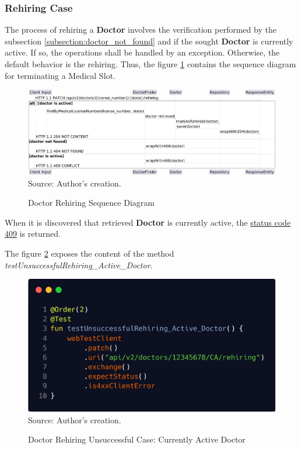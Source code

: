 \subsubsection{Rehiring  Case}
\label{subsection:doctor_rehiring}

The process of rehiring a \textbf{Doctor} involves the verification performed by the subsection \ref{subsection:doctor_not_found} and if the sought \textbf{Doctor} is currently active. If so, the operations shall be handled by an exception. Otherwise, the default behavior is the rehiring. Thus, the figure \ref{fig:doctor_rehiring_sequence_diagram} contains the sequence diagram for terminating a Medical Slot.

\begin{figure}[H]
	\centering
	\caption{Doctor Rehiring Sequence Diagram}
	\includegraphics[width=1\linewidth]{figures/doctor_rehiring_sequence_diagram.png}
	\\ \footnotesize Source: Author's creation.
	\label{fig:doctor_rehiring_sequence_diagram}
\end{figure}

When it is discovered that retrieved \textbf{Doctor} is currently active, the \hyperref[tab:summary_http_status_codes]{status code 409} is returned.

The figure \ref{fig:doctor_rehiring_unsuccessful_integration_test_active_doctor} exposes the content of the method \textit{testUnsuccessfulRehiring\_Active\_Doctor}.

\begin{figure}[H]
	\centering
	\caption{Doctor Rehiring Unsuccessful Case: Currently Active Doctor}
	\includegraphics[width=1\linewidth]
	{figures/doctor_rehiring_unsuccessful_integration_test_active_doctor.png}
	\label{fig:doctor_rehiring_unsuccessful_integration_test_active_doctor}
	\footnotesize Source: Author's creation.
\end{figure}

